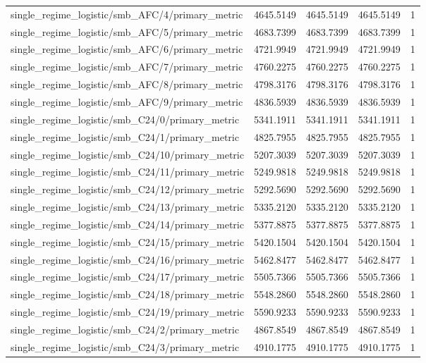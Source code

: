\begin{table}[h]
\begin{tabular}{lrrrr}
single_regime_logistic/smb_AFC/4/primary_metric & 4645.5149 & 4645.5149 & 4645.5149 & 1 \\
single_regime_logistic/smb_AFC/5/primary_metric & 4683.7399 & 4683.7399 & 4683.7399 & 1 \\
single_regime_logistic/smb_AFC/6/primary_metric & 4721.9949 & 4721.9949 & 4721.9949 & 1 \\
single_regime_logistic/smb_AFC/7/primary_metric & 4760.2275 & 4760.2275 & 4760.2275 & 1 \\
single_regime_logistic/smb_AFC/8/primary_metric & 4798.3176 & 4798.3176 & 4798.3176 & 1 \\
single_regime_logistic/smb_AFC/9/primary_metric & 4836.5939 & 4836.5939 & 4836.5939 & 1 \\
single_regime_logistic/smb_C24/0/primary_metric & 5341.1911 & 5341.1911 & 5341.1911 & 1 \\
single_regime_logistic/smb_C24/1/primary_metric & 4825.7955 & 4825.7955 & 4825.7955 & 1 \\
single_regime_logistic/smb_C24/10/primary_metric & 5207.3039 & 5207.3039 & 5207.3039 & 1 \\
single_regime_logistic/smb_C24/11/primary_metric & 5249.9818 & 5249.9818 & 5249.9818 & 1 \\
single_regime_logistic/smb_C24/12/primary_metric & 5292.5690 & 5292.5690 & 5292.5690 & 1 \\
single_regime_logistic/smb_C24/13/primary_metric & 5335.2120 & 5335.2120 & 5335.2120 & 1 \\
single_regime_logistic/smb_C24/14/primary_metric & 5377.8875 & 5377.8875 & 5377.8875 & 1 \\
single_regime_logistic/smb_C24/15/primary_metric & 5420.1504 & 5420.1504 & 5420.1504 & 1 \\
single_regime_logistic/smb_C24/16/primary_metric & 5462.8477 & 5462.8477 & 5462.8477 & 1 \\
single_regime_logistic/smb_C24/17/primary_metric & 5505.7366 & 5505.7366 & 5505.7366 & 1 \\
single_regime_logistic/smb_C24/18/primary_metric & 5548.2860 & 5548.2860 & 5548.2860 & 1 \\
single_regime_logistic/smb_C24/19/primary_metric & 5590.9233 & 5590.9233 & 5590.9233 & 1 \\
single_regime_logistic/smb_C24/2/primary_metric & 4867.8549 & 4867.8549 & 4867.8549 & 1 \\
single_regime_logistic/smb_C24/3/primary_metric & 4910.1775 & 4910.1775 & 4910.1775 & 1 \\

\end{tabular}
\end{table}
